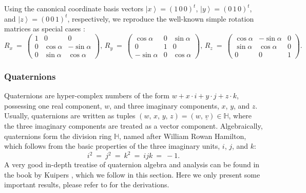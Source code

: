 Using the canonical coordinate basis vectors $\left| x \right> = \left( 1\,0\,0 \right)^t$, $\left| y \right> = \left( 0\,1\,0 \right)^t$,
and $\left| z \right> = \left( 0\,0\,1 \right)^t$, respectively, we reproduce the well-known simple rotation matrices as 
special cases \cite[p. 238]{Bronstein2008}:
\begin{equation}
	R_x \ =\ 
		\left( \begin{array}{ccc} 
			1 &            0 &            0  \\
			0 &  \cos \alpha & -\sin \alpha  \\
			0 & \sin \alpha  &  \cos \alpha
		\end{array} \right),\,
	R_y \ =\ 
		\left( \begin{array}{ccc} 
			  \cos \alpha &         0 &  \sin \alpha \\
			           0  &         1 &            0 \\
			-\sin \alpha  &         0 &  \cos \alpha
		\end{array} \right),\,
	R_z \ =\ 
		\left( \begin{array}{ccc} 
			 \cos \alpha & -\sin \alpha &             0  \\
			\sin \alpha  &  \cos \alpha &             0  \\
			           0 &            0 &             1
		\end{array} \right).
\end{equation}


\subsubsection{Quaternions}
Quaternions are hyper-complex numbers of the form $w + x \cdot i + y \cdot j + z \cdot k$, possessing one real 
component, $w$, and three imaginary components, $x$, $y$, and $z$. 
Usually, quaternions are written as tuples $\left( w,\,x,\,y,\,z \right) = \left( w,\,\underline{v} \right) \in \mathbb{H}$,
where the three imaginary components are treated as a vector component.
Algebraically, quaternions form the division ring $\mathbb{H}$, named after William Rowan Hamilton, which follows from the 
basic properties of the three imaginary units, $i$, $j$, and $k$:
\begin{equation}
	i^2 \ =\ j^2 \ =\ k^2 \ =\ ijk \ =\ -1.
	\label{eq:quat_basic}
\end{equation}
A very good in-depth treatise of quaternion algebra and analysis can be found in the book by Kuipers \cite{Kuipers2002},
which we follow in this section.
Here we only present some important results, please refer to \cite{Kuipers2002} for the derivations.

